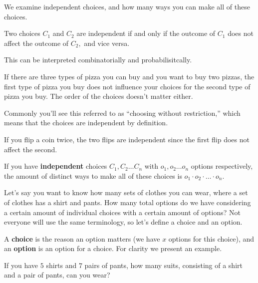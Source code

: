 \documentclass[blue,onecol]{shooting}
\begin{document}
We examine independent choices, and how many ways you can make all of these choices.

\begin{defi}
Two choices $C_1$ and $C_2$ are independent if and only if the outcome of $C_1$ does not affect the outcome of $C_2,$ and vice versa.
\end{defi}

This can be interpreted combinatorially and probabilisitcally.

\begin{exam}
If there are three types of pizza you can buy and you want to buy two pizzas, the first type of pizza you buy does not influence your choices for the second type of pizza you buy. The order of the choices doesn't matter either.
\end{exam}

Commonly you'll see this referred to as ``choosing without restriction,'' which means that the choices are independent by definition.

\begin{exam}
If you flip a coin twice, the two flips are independent since the first flip does not affect the second.
\end{exam}

\begin{theo}
If you have \textbf{independent} choices $C_1,C_2\dots C_n$ with $o_1,o_2\dots o_n$ options respectively, the amount of distinct ways to make all of these choices is $o_1\cdot o_2\cdot\dots\cdot o_n.$
\end{theo}

Let's say you want to know how many sets of clothes you can wear, where a set of clothes has a shirt and pants. How many total options do we have considering a certain amount of individual choices with a certain amount of options? Not everyone will use the same terminology, so let's define a choice and an option.

\begin{defi}
A \textbf{choice} is the reason an option matters (we have $x$ options for this choice), and an \textbf{option} is an option for a choice. For clarity we present an example.
\end{defi}

\begin{exam}
If you have $5$ shirts and $7$ pairs of pants, how many suits, consisting of a shirt and a pair of pants, can you wear?
\end{exam}
\end{document}
